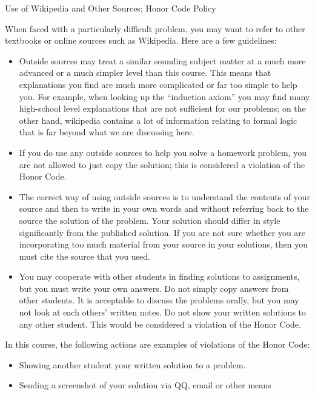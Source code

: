 \documentclass[smaller,hyperref={CJKbookmarks=true}]{beamer}
\begin{document}
\begin{frame}{Use of Wikipedia and Other Sources; Honor Code Policy}
\begin{spacing}{1.15}
When faced with a particularly dif{}ficult problem, you may want to refer to
other textbooks or online sources such as Wikipedia. Here are a few
guidelines:
\begin{itemize}
  \item Outside sources may treat a similar sounding subject matter at a
much more advanced or a much simpler level than this course. This
means that explanations you find are much more complicated or far
too simple to help you. For example, when looking up the ``induction
axiom'' you may find many high-school level explanations that are not
suf{}ficient for our problems; on the other hand, wikipedia contains a
lot of information relating to formal logic that is far beyond what we
are discussing here.
  \item If you do use any outside sources to help you solve a homework
problem, \textcolor[rgb]{1.00,0.00,0.00}{you are not allowed to just copy the solution;} this is
considered a violation of the Honor Code.
  \item The correct way of using outside sources is to understand the
contents of your source and then to write in your own words and
without referring back to the source the solution of the problem. Your
solution should dif{}fer in style significantly from the published solution.
\textcolor[rgb]{1.00,0.00,0.00}{If you are not sure whether you are incorporating too much material
from your source in your solutions, then you must cite the source that
you used.}
  \item You may cooperate with other students in finding solutions to
assignments, but you must write your own answers. \textcolor[rgb]{1.00,0.00,0.00}{Do not simply
copy answers from other students.} It is acceptable to discuss the
problems orally, but you may not look at each others' written notes.
\textcolor[rgb]{1.00,0.00,0.00}{Do not show your written solutions to any other student.} This would
be considered a violation of the Honor Code.
\end{itemize}
\newpage
In this course, the following actions are examples of violations of the
Honor Code:
\begin{itemize}
  \item Showing another student your written solution to a problem.
  \item Sending a screenshot of your solution via QQ, email or other means

\end{itemize}
\end{spacing}
\end{frame}
\end{document}
